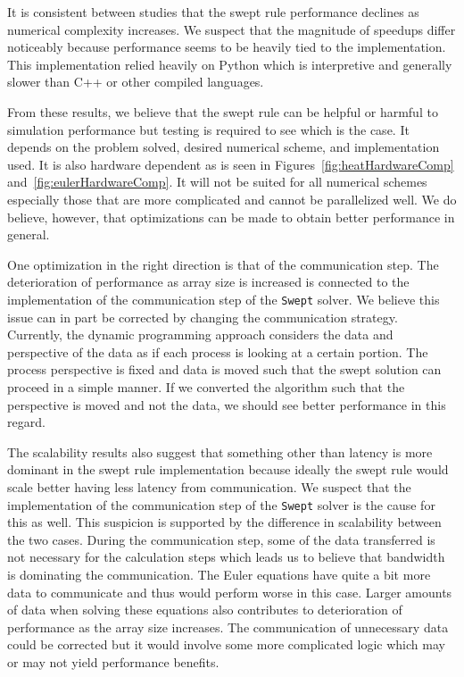\documentclass[preprints,article,accept,moreauthors,pdftex]{Definitions/mdpi}
\def\Swept{\texttt{Swept}}
\begin{document}
It is consistent between studies that the swept rule performance declines as numerical complexity increases. We suspect that the magnitude of speedups differ noticeably because performance seems to be heavily tied to the implementation. This implementation relied heavily on Python which is interpretive and generally slower than C++ or other compiled languages.  

From these results, we believe that the swept rule can be helpful or harmful to simulation performance but testing is required to see which is the case. It depends on the problem solved, desired numerical scheme, and implementation used. It is also hardware dependent as is seen in Figures~\ref{fig:heatHardwareComp} and~\ref{fig:eulerHardwareComp}. It will not be suited for all numerical schemes especially those that are more complicated and cannot be parallelized well. We do believe, however, that optimizations can be made to obtain better performance in general. 

One optimization in the right direction is that of the communication step. The deterioration of performance as array size is increased is connected to the implementation of the communication step of the \Swept{} solver. We believe this issue can in part be corrected by changing the communication strategy. Currently, the dynamic programming approach considers the data and perspective of the data as if each process is looking at a certain portion. The process perspective is fixed and data is moved such that the swept solution can proceed in a simple manner. If we converted the algorithm such that the perspective is moved and not the data, we should see better performance in this regard.

The scalability results also suggest that something other than latency is more dominant in the swept rule implementation because ideally the swept rule would scale better having less latency from communication. We suspect that the implementation of the communication step of the \Swept{} solver is the cause for this as well. This suspicion is supported by the difference in scalability between the two cases. During the communication step, some of the data transferred is not necessary for the calculation steps which leads us to believe that bandwidth is dominating the communication. The Euler equations have quite a bit more data to communicate and thus would perform worse in this case. Larger amounts of data when solving these equations also contributes to deterioration of performance as the array size increases. The communication of unnecessary data could be corrected but it would involve some more complicated logic which may or may not yield performance benefits.
\end{document}
